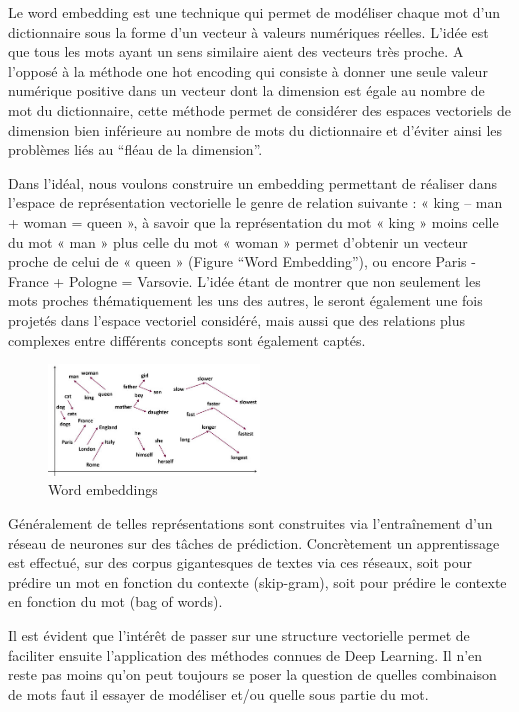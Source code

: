 \documentclass[8pt]{article}
\begin{document}
    Le word embedding est une technique qui permet de modéliser chaque mot
d'un dictionnaire sous la forme d'un vecteur à valeurs numériques
réelles. L'idée est que tous les mots ayant un sens similaire aient des
vecteurs très proche. A l'opposé à la méthode one hot encoding qui
consiste à donner une seule valeur numérique positive dans un vecteur
dont la dimension est égale au nombre de mot du dictionnaire, cette
méthode permet de considérer des espaces vectoriels de dimension bien
inférieure au nombre de mots du dictionnaire et d'éviter ainsi les
problèmes liés au ``fléau de la dimension''.

    Dans l'idéal, nous voulons construire un embedding permettant de
réaliser dans l'espace de représentation vectorielle le genre de
relation suivante : « king -- man + woman = queen », à savoir que la
représentation du mot « king » moins celle du mot « man » plus celle du
mot « woman » permet d'obtenir un vecteur proche de celui de « queen »
(Figure ``Word Embedding''), ou encore Paris - France + Pologne =
Varsovie. L'idée étant de montrer que non seulement les mots proches
thématiquement les uns des autres, le seront également une fois projetés
dans l'espace vectoriel considéré, mais aussi que des relations plus
complexes entre différents concepts sont également captés.

\begin{figure}
\centering
\includegraphics[width=0.5\textwidth]{blog-17-3-1.jpg}
\caption{Word embeddings}
\end{figure}
    

    Généralement de telles représentations sont construites via
l'entraînement d'un réseau de neurones sur des tâches de prédiction.
Concrètement un apprentissage est effectué, sur des corpus gigantesques
de textes via ces réseaux, soit pour prédire un mot en fonction du
contexte (skip-gram), soit pour prédire le contexte en fonction du mot
(bag of words).

    Il est évident que l'intérêt de passer sur une structure vectorielle
permet de faciliter ensuite l'application des méthodes connues de Deep
Learning. Il n'en reste pas moins qu'on peut toujours se poser la
question de quelles combinaison de mots faut il essayer de modéliser
et/ou quelle sous partie du mot.
\end{document}
